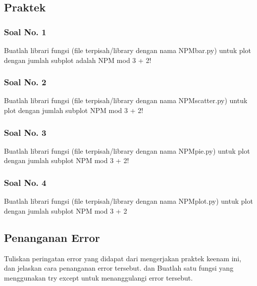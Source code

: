\subsection{Praktek}
\subsubsection{Soal No. 1}
\hfill \break
Buatlah librari fungsi (file terpisah/library dengan nama NPMbar.py) untuk plot dengan jumlah subplot adalah NPM mod 3 + 2!

\subsubsection{Soal No. 2}
\hfill \break
Buatlah librari fungsi (file terpisah/library dengan nama NPMscatter.py) untuk plot dengan jumlah subplot NPM mod 3 + 2!

\subsubsection{Soal No. 3}
\hfill \break
Buatlah librari fungsi (file terpisah/library dengan nama NPMpie.py) untuk plot dengan jumlah subplot NPM mod 3 + 2!

\subsubsection{Soal No. 4}
\hfill \break
Buatlah librari fungsi (file terpisah/library dengan nama NPMplot.py) untuk plot dengan jumlah subplot NPM mod 3 + 2


\subsection{Penanganan Error}
Tuliskan  peringatan  error  yang  didapat  dari  mengerjakan  praktek  keenam  ini, dan  jelaskan  cara  penanganan  error  tersebut. dan  Buatlah  satu  fungsi  yang menggunakan try except untuk menanggulangi error tersebut.
